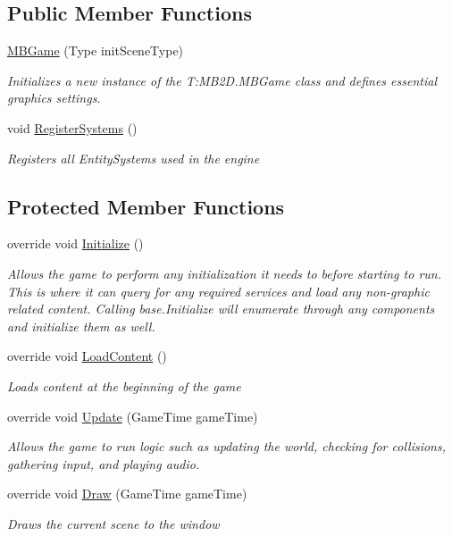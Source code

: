 \subsection*{Public Member Functions}
\begin{DoxyCompactItemize}
\item 
\hyperlink{class_m_b2_d_1_1_m_b_game_aa75fd490a977436f16a048d38face6f9}{M\+B\+Game} (Type init\+Scene\+Type)
\begin{DoxyCompactList}\small\item\em Initializes a new instance of the T\+:\+M\+B2\+D.\+M\+B\+Game class and defines essential graphics settings. \end{DoxyCompactList}\item 
void \hyperlink{class_m_b2_d_1_1_m_b_game_ad7e9a60dbaefe1416db0456b07b13487}{Register\+Systems} ()
\begin{DoxyCompactList}\small\item\em Registers all Entity\+Systems used in the engine \end{DoxyCompactList}\end{DoxyCompactItemize}
\subsection*{Protected Member Functions}
\begin{DoxyCompactItemize}
\item 
override void \hyperlink{class_m_b2_d_1_1_m_b_game_a2157be479c1831c49301cd472cc01cde}{Initialize} ()
\begin{DoxyCompactList}\small\item\em Allows the game to perform any initialization it needs to before starting to run. This is where it can query for any required services and load any non-\/graphic related content. Calling base.\+Initialize will enumerate through any components and initialize them as well. \end{DoxyCompactList}\item 
override void \hyperlink{class_m_b2_d_1_1_m_b_game_a64ee7de17491790b25b326a644789082}{Load\+Content} ()
\begin{DoxyCompactList}\small\item\em Loads content at the beginning of the game \end{DoxyCompactList}\item 
override void \hyperlink{class_m_b2_d_1_1_m_b_game_a82968a66f75f9c437074ce7bfd468455}{Update} (Game\+Time game\+Time)
\begin{DoxyCompactList}\small\item\em Allows the game to run logic such as updating the world, checking for collisions, gathering input, and playing audio. \end{DoxyCompactList}\item 
override void \hyperlink{class_m_b2_d_1_1_m_b_game_ad791072c4d2a5b23bbaec3542d6facc9}{Draw} (Game\+Time game\+Time)
\begin{DoxyCompactList}\small\item\em Draws the current scene to the window \end{DoxyCompactList}\end{DoxyCompactItemize}
